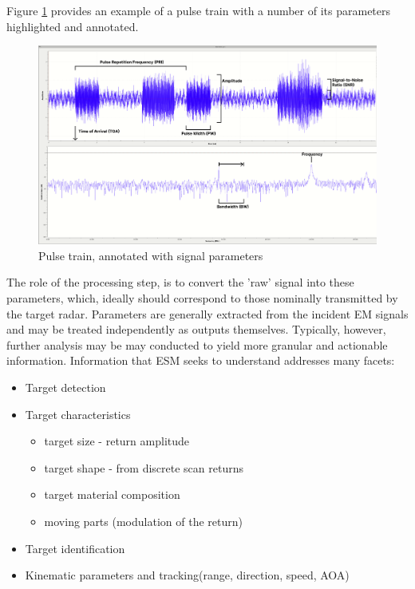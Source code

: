 Figure \ref{fig:pulse_train} provides an example of a pulse train with a number of its parameters highlighted and annotated.

\begin{figure}[t]
    \centering
    \includegraphics[width=1\textwidth]{Figures/annotated.png}
    \caption{Pulse train, annotated with signal parameters}
    \label{fig:pulse_train}
\end{figure}

The role of the processing step, is to convert the 'raw' signal into these parameters, which, ideally should correspond to those nominally transmitted by the target radar.
Parameters are generally extracted from the incident \ac{EM} signals and may be treated independently as outputs themselves. Typically, however, further analysis may be may conducted to yield more granular and actionable information. Information that \ac{ESM} seeks to understand addresses many facets:
\begin{itemize}
    \item Target detection
    \item Target characteristics \cite{jenn_radar_2007}
    \begin{itemize}
        \item target size - return amplitude
        \item target shape - from discrete scan returns
        \item target material composition
        \item moving parts (modulation of the return)
    \end{itemize}
    \item Target identification
    \item Kinematic parameters and tracking(range, direction, speed, \ac{AOA})
\end{itemize}

